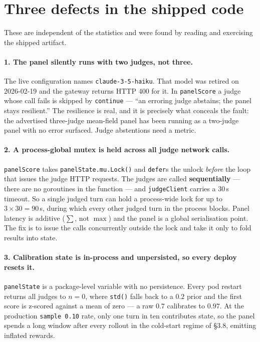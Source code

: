 \documentclass[11pt]{article}
\theoremstyle{definition}
\begin{document}
\section{Three defects in the shipped code}
\label{sec:defects}

These are independent of the statistics and were found by reading and exercising the shipped
artifact.

\paragraph{1. The panel silently runs with two judges, not three.}
The live configuration names \texttt{claude-3-5-haiku}. That model was retired on 2026-02-19
and the gateway returns HTTP 400 for it. In \texttt{panelScore} a judge whose call fails is
skipped by \texttt{continue} --- ``an erroring judge abstains; the panel stays resilient.''
The resilience is real, and it is precisely what conceals the fault: the advertised three-judge
mean-field panel has been running as a two-judge panel with no error surfaced. Judge
abstentions need a metric.

\paragraph{2. A process-global mutex is held across all judge network calls.}
\texttt{panelScore} takes \texttt{panelState.mu.Lock()} and \texttt{defer}s the unlock
\emph{before} the loop that issues the judge HTTP requests. The judges are called
\textbf{sequentially} --- there are no goroutines in the function --- and \texttt{judgeClient}
carries a $30$\,s timeout. So a single judged turn can hold a process-wide lock for up to
$3\times30 = 90$\,s, during which every other judged turn in the process blocks. Panel latency
is additive ($\sum$, not $\max$) and the panel is a global serialisation point. The fix is to
issue the calls concurrently outside the lock and take it only to fold results into state.

\paragraph{3. Calibration state is in-process and unpersisted, so every deploy resets it.}
\texttt{panelState} is a package-level variable with no persistence. Every pod restart returns
all judges to $n{=}0$, where \texttt{std()} falls back to a $0.2$ prior and the first score is
z-scored against a mean of zero --- a raw $0.7$ calibrates to $0.97$. At the production
\texttt{sample 0.10} rate, only one turn in ten contributes state, so the panel spends a long
window after every rollout in the cold-start regime of \S3.8, emitting inflated rewards.
\end{document}

